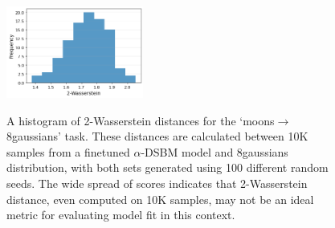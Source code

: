 \documentclass{article}
\begin{document}
\begin{table}[htb]
    \vspace{1mm}
    \caption{2-Wasserstein distance and path energy for the 2D experiments. We report means $\pm1$ standard deviations across 5 random seeds. DSBM-IMF* and OT-CFM* results are copied from \cite{shi2023DSBM}.}
    \label{table:2d}
\end{table}


\begin{figure}[htbp]
    \centering 
   {\includegraphics[width=0.4\textwidth]{img/w2_hist.png}}
    \caption{A histogram of 2-Wasserstein distances for the `moons$\rightarrow$ 8gaussians' task. These distances are calculated between 10K samples from a finetuned $\alpha$-DSBM model and 8gaussians distribution, with both sets generated using 100 different random seeds. The wide spread of scores indicates that 2-Wasserstein distance, even computed on 10K samples, may not be an ideal metric for evaluating model fit in this context.} 
    \label{fig:w2} 
\end{figure}
\end{document}
